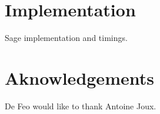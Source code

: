\documentclass{sig-alternate}
\begin{document}

\section{Implementation}
\label{sec:impl}

Sage implementation and timings.


\section{Aknowledgements}
De Feo would like to thank Antoine Joux.

\scriptsize


\end{document}
